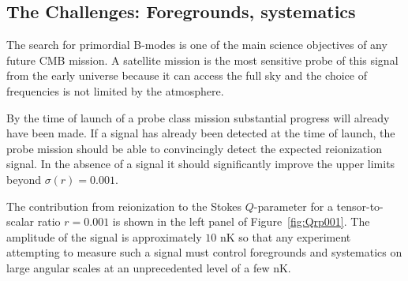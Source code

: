 \subsection{The Challenges: Foregrounds, systematics}
\label{sec:foregrounds}
\vspace{-0.05in}

The search for primordial B-modes is one of the main science objectives of any future CMB mission. A satellite mission is the most sensitive probe of this signal from the early universe because it can access the full sky and the choice of frequencies is not limited by the atmosphere. 

By the time of launch of a probe class mission substantial progress will already have been made. If a signal has already been detected at the time of launch, the probe mission should be able to convincingly detect the expected reionization signal. In the absence of a signal it should significantly improve the upper limits beyond $\sigma(r)=0.001$. 

The contribution from reionization to the Stokes $Q$-parameter for a tensor-to-scalar ratio $r=0.001$ is shown in the left panel of Figure~\ref{fig:Qrp001}. The amplitude of the signal is approximately $10$ nK so that any experiment attempting to measure such a signal must control foregrounds and systematics on large angular scales at an unprecedented level of a few nK. 

